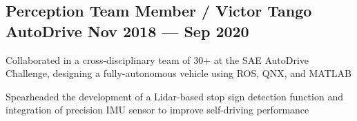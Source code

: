 
\subsection{{Perception Team Member / Victor Tango AutoDrive \hfill Nov 2018 --- Sep 2020}}
\begin{zitemize}
	\item Collaborated in a cross-disciplinary team of 30+ at the SAE AutoDrive Challenge, designing a fully-autonomous vehicle using ROS, QNX, and MATLAB
	\item Spearheaded the development of a Lidar-based stop sign detection function and integration of precision IMU sensor to improve self-driving performance
\end{zitemize}

